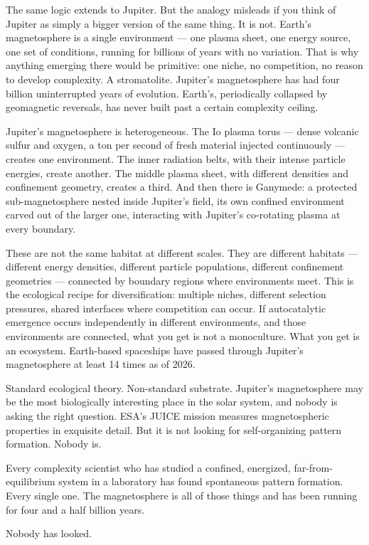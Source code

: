 The same logic extends to Jupiter. But the analogy misleads if you think of Jupiter as simply a bigger version of the same thing. It is not. Earth's magnetosphere is a single environment --- one plasma sheet, one energy source, one set of conditions, running for billions of years with no variation. That is why anything emerging there would be primitive: one niche, no competition, no reason to develop complexity. A stromatolite. Jupiter's magnetosphere has had four billion uninterrupted years of evolution. Earth's, periodically collapsed by geomagnetic reversals, has never built past a certain complexity ceiling.

Jupiter's magnetosphere is heterogeneous. The Io plasma torus --- dense volcanic sulfur and oxygen, a ton per second of fresh material injected continuously --- creates one environment. The inner radiation belts, with their intense particle energies, create another. The middle plasma sheet, with different densities and confinement geometry, creates a third. And then there is Ganymede: a protected sub-magnetosphere nested inside Jupiter's field, its own confined environment carved out of the larger one, interacting with Jupiter's co-rotating plasma at every boundary.

These are not the same habitat at different scales. They are different habitats --- different energy densities, different particle populations, different confinement geometries --- connected by boundary regions where environments meet. This is the ecological recipe for diversification: multiple niches, different selection pressures, shared interfaces where competition can occur. If autocatalytic emergence occurs independently in different environments, and those environments are connected, what you get is not a monoculture. What you get is an ecosystem. Earth-based spaceships have passed through Jupiter's magnetosphere at least 14 times as of 2026.

Standard ecological theory. Non-standard substrate. Jupiter's magnetosphere may be the most biologically interesting place in the solar system, and nobody is asking the right question. ESA's JUICE mission measures magnetospheric properties in exquisite detail. But it is not looking for self-organizing pattern formation. Nobody is.

Every complexity scientist who has studied a confined, energized, far-from-equilibrium system in a laboratory has found spontaneous pattern formation. Every single one. The magnetosphere is all of those things and has been running for four and a half billion years.

Nobody has looked.

\chapterreturn

